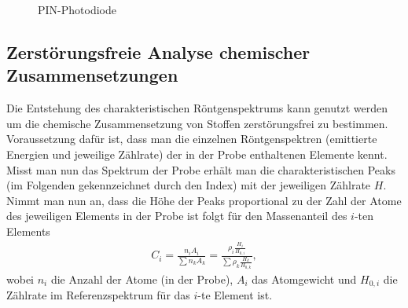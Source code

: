 \begin{figure}[h]
  \centering
  \caption{PIN-Photodiode}
  \label{fig:pin}
\end{figure}

\subsection{Zerstörungsfreie Analyse chemischer Zusammensetzungen}
Die Entstehung des charakteristischen Röntgenspektrums kann genutzt werden um die chemische Zusammensetzung von Stoffen zerstörungsfrei zu bestimmen. Voraussetzung dafür ist, dass man die einzelnen Röntgenspektren (emittierte Energien und jeweilige Zählrate) der in der Probe enthaltenen Elemente kennt. Misst man nun das Spektrum der Probe erhält man die charakteristischen Peaks (im Folgenden gekennzeichnet durch den Index) mit der jeweiligen Zählrate $H$. Nimmt man nun an, dass die Höhe der Peaks proportional zu der Zahl der Atome des jeweiligen Elements in der Probe ist folgt für den Massenanteil des $i$-ten Elements
\begin{align}
  C_i=\frac{n_iA_i}{\sum n_k A_k}=\frac{\rho_i \frac{H_i}{H_{0,i}}}{\sum \rho_k \frac{H_k}{H_{0,k}}},
\end{align}  
wobei $n_i$ die Anzahl der Atome (in der Probe), $A_i$ das Atomgewicht und $H_{0,i}$ die Zählrate im Referenzspektrum für das $i$-te Element ist. 

